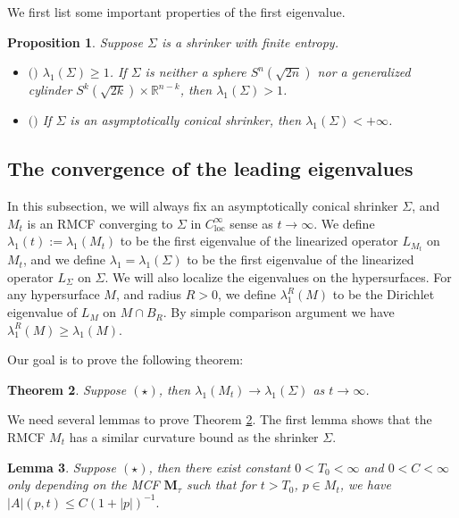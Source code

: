 \documentclass[12pt]{amsart}
\numberwithin{equation}{section}
\newtheorem{theorem}{Theorem}[section]
\newtheorem{proposition}[theorem]{Proposition}
\newtheorem{lemma}[theorem]{Lemma}
\numberwithin{equation}{section}
\newcommand{\R}{\mathbb{R}}
\DeclareMathOperator{\loc}{loc}
\begin{document}
	
	We first list some important properties of the first eigenvalue. 
	\begin{proposition}
		Suppose $\Sigma$ is a shrinker with finite entropy.
		\begin{itemize}
			\item $($\cite{CM1}$)$ $\lambda_1(\Sigma)\geq 1$. If $\Sigma$ is neither a sphere $S^n(\sqrt{2n})$ nor a generalized cylinder $S^k(\sqrt{2k})\times\R^{n-k}$, then $\lambda_1(\Sigma)>1$.
			\item $($\cite{BW}$)$ If $\Sigma$ is an asymptotically conical shrinker, then $\lambda_1(\Sigma)<+\infty$. 
		\end{itemize}
	\end{proposition}
	
	\subsection{The convergence of the leading eigenvalues}\label{SSConvergeEigen}
	In this subsection, we will always fix an asymptotically conical shrinker $\Sigma$, and $M_t$ is an RMCF converging to $\Sigma$ in $C_{\loc}^\infty$ sense as $t\to\infty$. We define $\lambda_1(t):=\lambda_1(M_t)$ to be the first eigenvalue of the linearized operator $L_{M_t}$ on $M_t$, and we define $\lambda_1=\lambda_1(\Sigma)$ to be the first eigenvalue of the linearized operator $L_\Sigma$ on $\Sigma$. We will also localize the eigenvalues on the hypersurfaces. For any hypersurface $M$, and radius $R>0$, we define $\lambda_1^R(M)$ to be the Dirichlet eigenvalue of $L_M$ on $M\cap B_R$. By simple comparison argument we have $\lambda_1^R(M)\geq \lambda_1(M)$.
	
	Our goal is to prove the following theorem:
	
	
	\begin{theorem}\label{thm:eigenvalue convergence}
		Suppose  $(\star)$, then $\lambda_1(M_t)\to\lambda_1(\Sigma)$ as $t\to\infty$. 
	\end{theorem}
	
	We need several lemmas to prove Theorem \ref{thm:eigenvalue convergence}. The first lemma shows that the RMCF $M_t$ has a similar curvature bound as the shrinker $\Sigma$.
	
	\begin{lemma}\label{lem:eigenconverge-Abound}
		Suppose $(\star)$, then there exist constant $0<T_0<\infty$ and $0<C<\infty$ only depending on the MCF $\mathbf{M}_\tau$ such that for $t>T_0$, $p\in M_t$,
		we have $|A|(p,t)\leq C(1+|p|)^{-1}.$
	\end{lemma}
	
\end{document}
